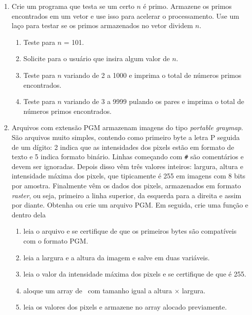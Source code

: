 \begin{enumerate}
  \item Crie um programa que testa se um certo $n$ é primo. Armazene os primos encontrados em um vetor e use isso para acelerar o processamento. Use um laço para testar se os primos armazenados no vetor dividem $n$.
    \begin{enumerate}
      \item Teste para $n$ = 101.
      \item Solicite para o usuário que insira algum valor de $n$.
      \item Teste para $n$ variando de 2 a 1000 e imprima o total de números primos encontrados.
      \item Teste para $n$ variando de 3 a 9999 pulando os pares e imprima o total de números primos encontrados.
    \end{enumerate}

  \item Arquivos com extensão PGM armazenam imagens do tipo \textit{portable graymap}. São arquivos muito simples, contendo como primeiro byte a letra P seguida de um dígito: 2 indica que as intensidades dos pixels estão em formato de texto e 5 indica formato binário. Linhas começando com {\tt \#} são comentários e devem ser ignoradas. Depois disso vêm três valores inteiros: largura, altura e intensidade máxima dos pixels, que tipicamente é 255 em imagens com 8 bits por amostra. Finalmente vêm os dados dos pixels, armazenados em formato \textit{raster}, ou seja, primeiro a linha superior, da esquerda para a direita e assim por diante. Obtenha ou crie um arquivo PGM. Em seguida, crie uma função \MAIN e dentro dela
    \begin{enumerate}
      \item leia o arquivo e se certifique de que os primeiros bytes são compatíveis com o formato PGM.
      \item leia a largura e a altura da imagem e salve em duas variáveis.
      \item leia o valor da intensidade máxima dos pixels e se certifique de que é 255.
      \item aloque um array de \CHAR\ com tamanho igual a altura $\times$ largura.
      \item leia os valores dos pixels e armazene no array alocado previamente.
    \end{enumerate}


\end{enumerate}
